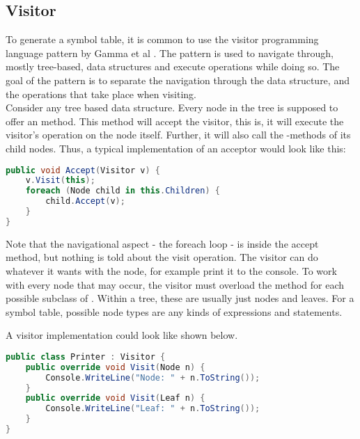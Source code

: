 
\subsection{Visitor}
To generate a symbol table, it is common to use the visitor programming language pattern by Gamma et al \cite{gof}. 
The pattern is used to navigate through, mostly tree-based, data structures and execute operations while doing so.
The goal of the pattern is to separate the navigation through the data structure, and the operations that take place when visiting.\\

Consider any tree based data structure.
Every node in the tree is supposed to offer an  method.
This method will accept the visitor, this is, it will execute the visitor's operation on the node itself.
Further, it will also call the -methods of its child nodes.
Thus, a typical implementation of an acceptor would look like this:

\begin{lstlisting}[language=csharp, caption={Example for Accept}, captionpos=b, label={lst:accept}]
public void Accept(Visitor v) {
    v.Visit(this);
    foreach (Node child in this.Children) {
        child.Accept(v);
    }
}
\end{lstlisting}

Note that the navigational aspect - the foreach loop - is inside the accept method, but nothing is told about the visit operation.
The visitor can do whatever it wants with the node, for example print it to the console.
To work with every node that may occur, the visitor must overload the  method for each possible subclass of .
Within a tree, these are usually just nodes and leaves.
For a symbol table, possible node types are any kinds of expressions and statements.

A visitor implementation could look like shown below.

\begin{lstlisting}[language=csharp, caption={Example for Visitor}, captionpos=b, label={lst:visitor}]
public class Printer : Visitor {
    public override void Visit(Node n) {
        Console.WriteLine("Node: " + n.ToString());
    }
    public override void Visit(Leaf n) {
        Console.WriteLine("Leaf: " + n.ToString());
    }
}
\end{lstlisting}

